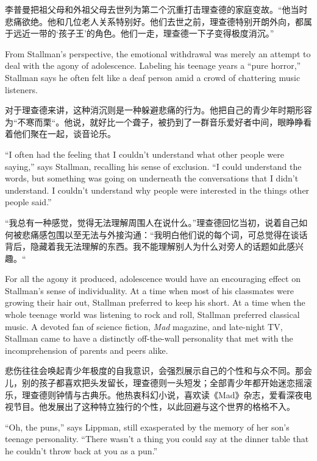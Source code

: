 \ifdefined\chs
李普曼把祖父母和外祖父母去世列为第二个沉重打击理查德的家庭变故。“他当时悲痛欲绝。他和几位老人关系特别好。他们去世之前，理查德特别开朗外向，都属于远近一带的‘孩子王’的角色。他们一走，理查德一下子变得极度消沉。”
\fi

\ifdefined\eng
From Stallman's perspective, the emotional withdrawal was merely an attempt to deal with the agony of adolescence. Labeling his teenage years a ``pure horror,'' Stallman says he often felt like a deaf person amid a crowd of chattering music listeners.
\fi

\ifdefined\chs
对于理查德来讲，这种消沉则是一种躲避悲痛的行为。他把自己的青少年时期形容为“不寒而栗“。他说，就好比一个聋子，被扔到了一群音乐爱好者中间，眼睁睁看着他们聚在一起，谈音论乐。
\fi

\ifdefined\eng
``I often had the feeling that I couldn't understand what other people were saying,'' says Stallman, recalling his sense of exclusion. ``I could understand the words, but something was going on underneath the conversations that I didn't understand. I couldn't understand why people were interested in the things other people said.''
\fi

\ifdefined\chs
“我总有一种感觉，觉得无法理解周围人在说什么。”理查德回忆当初，说着自己如何被悲痛感包围以至无法与外接沟通：“我明白他们说的每个词，可总觉得在谈话背后，隐藏着我无法理解的东西。我不能理解别人为什么对旁人的话题如此感兴趣。“
\fi

\ifdefined\eng
For all the agony it produced, adolescence would have an encouraging effect on Stallman's sense of individuality. At a time when most of his classmates were growing their hair out, Stallman preferred to keep his short. At a time when the whole teenage world was listening to rock and roll, Stallman preferred classical music. A devoted fan of science fiction, \textit{Mad} magazine, and late-night TV, Stallman came to have a distinctly off-the-wall personality that met with the incomprehension of parents and peers alike.
\fi

\ifdefined\chs
悲伤往往会唤起青少年极度的自我意识，会强烈展示自己的个性和与众不同。那会儿，别的孩子都喜欢把头发留长，理查德则一头短发；全部青少年都开始迷恋摇滚乐，理查德则钟情与古典乐。他热衷科幻小说，喜欢读《Mad》杂志，爱看深夜电视节目。他发展出了这种特立独行的个性，以此回避与这个世界的格格不入。
\fi

\ifdefined\eng
``Oh, the puns,'' says Lippman, still exasperated by the memory of her son's teenage personality. ``There wasn't a thing you could say at the dinner table that he couldn't throw back at you as a pun.''
\fi

